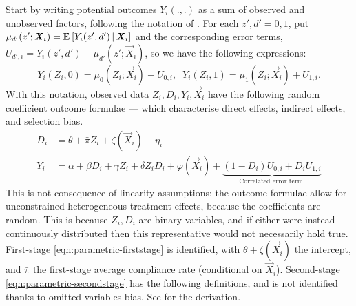 Start by writing potential outcomes $Y_i(., .)$ as a sum of observed and unobserved factors, following the notation of \cite{heckman2005structural}.
For each $z',d' = 0,1$, put $\mu_{d'}(z'; \boldsymbol{\mathit{X}}_i) = \mathbb{E}_{} \left[ Y_i(z', d') \, \middle\vert \, \boldsymbol{\mathit{X}}_i \right]$ and the corresponding error terms, $U_{d', i} = Y_i(z', d') - \mu_{d'}(z'; \vec X_i)$, so we have the following expressions:
\[ Y_i(Z_i, 0)  = \mu_{0}(Z_i; \vec X_i) + U_{0,i}, \;\;
    Y_i(Z_i, 1) = \mu_{1}(Z_i; \vec X_i) + U_{1,i}. \]
With this notation, observed data $Z_i, D_i, Y_i, \vec X_i$ have the following random coefficient outcome formulae --- which characterise direct effects, indirect effects, and selection bias.
\begin{align}
    \label{eqn:parametric-firststage}
    D_i &= \theta + \bar \pi Z_i + \zeta(\vec X_i) + \eta_i  \\
    \label{eqn:parametric-secondstage}
    Y_i &= \alpha + \beta D_i + \gamma Z_i + \delta Z_i D_i
    + \varphi(\vec X_i)
    + \underbrace{ \left(1 - D_i \right) U_{0,i} + D_i U_{1,i}}_{
        \text{Correlated error term.}}
\end{align}
This is not consequence  of linearity assumptions; the outcome formulae allow for unconstrained heterogeneous treatment effects, because the coefficients are random.
This is because $Z_i, D_i$ are binary variables, and if either were instead continuously distributed then this representative would not necessarily hold true.
First-stage \eqref{eqn:parametric-firststage} is identified, with $\theta + \zeta(\vec X_i)$ the intercept, and $\bar \pi$ the first-stage average compliance rate (conditional on $\vec X_i$).
Second-stage \eqref{eqn:parametric-secondstage} has the following definitions, and is not identified thanks to omitted variables bias.
See  for the derivation.
